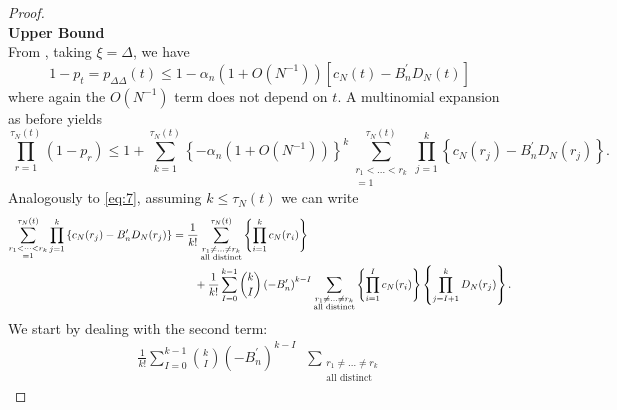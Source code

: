 \documentclass{article}
\newcommand{\E}{\mathbb{E}}
\newcommand{\1}[1]{\mathbbm{1}_{#1}}
\begin{document}
\begin{proof}
\textbf{\\Upper Bound}\\
From \citet[Lemma 1 Case 1]{koskela2018}, taking $\xi=\Delta$, we have
\begin{equation}
1-p_t = p_{\Delta\Delta}(t) \leq 1 - \alpha_n (1+O(N^{-1})) \left[ c_N(t) - B_n^\prime D_N(t) \right] 
\end{equation}
where again the $O(N^{-1})$ term does not depend on $t$.
A multinomial expansion as before yields
\begin{equation}
\prod_{r=1}^{\tau_N(t)} (1-p_r)
\leq 1 + \sum_{k=1}^{\tau_N(t)} \left\{- \alpha_n (1+O(N^{-1}))\right\}^k \sum_{\substack{r_1<\dots<r_k \\ =1}}^{\tau_N(t)}\prod_{j=1}^k 
\left\{ c_N(r_j) - B_n^\prime D_N(r_j) \right\} .
\end{equation}
Analogously to \eqref{eq:7}, assuming $k\leq\tau_N(t)$ we can write
\begin{align}
\sum_{\substack{r_1<\dots<r_k \\ =1}}^{\tau_N(t)}\prod_{j=1}^k 
\left\{ c_N(r_j) - B_n^\prime D_N(r_j) \right\}
&= \frac{1}{k!} \sum_{\substack{r_1\neq\dots\neq r_k \\ \text{all distinct}}}^{\tau_N(t)}
\left\{ \prod_{i=1}^k c_N(r_i) \right\} \label{eq:18}\\
&\qquad + \frac{1}{k!} \sum_{I=0}^{k-1} \binom{k}{I} \left( -B_n^\prime \right)^{k-I}
\sum_{\substack{r_1\neq\dots\neq r_k \\ \text{all distinct}}}
\left\{ \prod_{i=1}^I c_N(r_i) \right\}
\left\{ \prod_{j=I+1}^k D_N(r_j) \right\} .\notag
\end{align}
We start by dealing with the second term:
\begin{align}
\frac{1}{k!} \sum_{I=0}^{k-1} \binom{k}{I} \left( -B_n^\prime \right)^{k-I}
&\sum_{\substack{r_1\neq\dots\neq r_k \\ \text{all distinct}}}

\end{align}
\end{proof}
\end{document}
